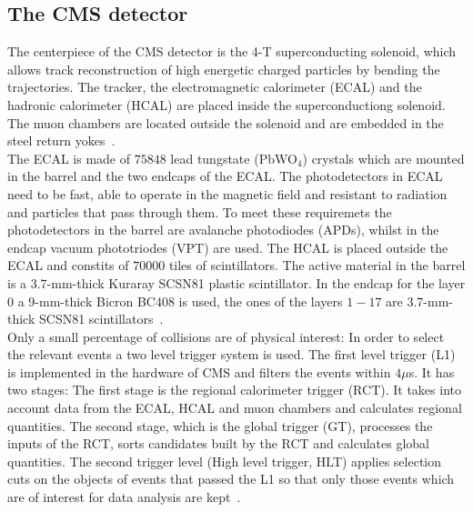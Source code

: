 \subsection{The CMS detector}
\label{sec:cms_det}

The centerpiece of the CMS detector is the 4-T superconducting solenoid, which allows track reconstruction of high energetic charged particles by bending the trajectories. The tracker,
the electromagnetic calorimeter (ECAL) and the hadronic calorimeter (HCAL) are placed inside the superconductiong solenoid. The muon chambers are located outside the solenoid and are embedded in the steel return yokes~\cite{CMS:2008}. \\

The ECAL is made of $75 848$ lead tungstate (PbWO$_4$) crystals which are mounted in the barrel and the two endcaps of the ECAL. The photodetectors in ECAL need to be fast, able to operate in the magnetic field and
resistant to radiation and particles that pass through them. To meet these requiremets the photodetectors in the barrel are avalanche photodiodes (APDs), whilst in the endcap vacuum phototriodes (VPT) are used.
The HCAL is placed outside the ECAL and constits of $70 000$ tiles of scintillators. The active material in the barrel is a 3.7-mm-thick Kuraray SCSN81 plastic scintillator. 
In the endcap for the layer $0$ a 9-mm-thick Bicron BC408 is used, the ones of the layers $1-17$ are 3.7-mm-thick SCSN81 scintillators~\cite{CMS:2008}.\\

Only a small percentage of collisions are of physical interest: In order to select the relevant events a two level trigger system is used. The first level trigger (L1) is implemented in the hardware of CMS and filters the events
within $4 \mu$s. It has two stages: The first stage is the regional calorimeter trigger (RCT). It takes into account data from the ECAL, HCAL and muon chambers and calculates regional quantities. The second stage, which is the global trigger (GT), processes the inputs of the RCT,
sorts candidates built by the RCT and calculates global quantities. The second trigger level (High level trigger, HLT) applies selection cuts on the objects of events that passed the L1 so that only those events which
are of interest for data analysis are kept~\cite{CMS:2017trg}. \\

